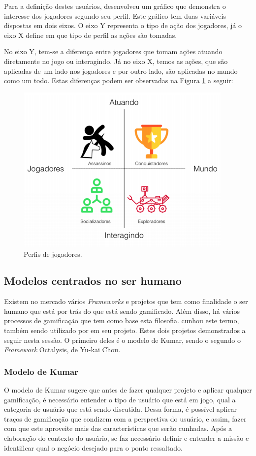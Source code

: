 Para a definição destes usuários, \cite{bartle1996hearts} desenvolveu um gráfico que demonstra o
interesse dos jogadores segundo seu perfil. Este gráfico tem duas variáveis dispostas
em dois eixos. O eixo Y representa o tipo de ação dos jogadores, já o eixo X define
em que tipo de perfil as ações são tomadas.

No eixo Y, tem-se a diferença entre jogadores
que tomam ações atuando diretamente no jogo ou interagindo. Já no eixo X, temos as ações,
que são aplicadas de um lado nos jogadores e por outro lado, são aplicadas no mundo como
um todo. Estas diferenças podem ser observadas na Figura \ref{fig:perfiljogadores} a seguir:

\begin{figure}[h]
    \centering
    \includegraphics[width=400px, scale=1]{figuras/perfiljogadores}
    \caption{Perfis de jogadores.}
    \label{fig:perfiljogadores}
\end{figure}


\subsection{Modelos centrados no ser humano}
\label{sub:modelosnoserhumano}
Existem no mercado vários \textit{Frameworks} e projetos que tem como finalidade o ser
humano que está por trás do que está sendo gamificado. Além disso, há
vários processos de gamificação que tem como base esta filosofia. 
\cite{kumar2013gamification}
cunhou este termo, também sendo utilizado por \cite{chou2015actionable} em seu projeto.
Estes dois projetos demonstrados a seguir nesta sessão. O primeiro
deles é o modelo de Kumar, sendo o segundo o \textit{Framework} Octalysis, de Yu-kai Chou.

\subsubsection{Modelo de Kumar}
\label{sub:modelodekumar}
O modelo de Kumar sugere que antes de fazer qualquer projeto e aplicar qualquer gamificação,
é necessário entender o tipo de usuário que está em jogo, qual a categoria de usuário
que está sendo discutida. Dessa forma, é possível aplicar traços de gamificação
que condizem com a perspectiva do usuário, e assim, fazer com que este aproveite
mais das características que serão cunhadas. Após a elaboração do contexto do
usuário, se faz necessário definir e entender a missão e identificar qual o negócio
desejado para o ponto ressaltado.

